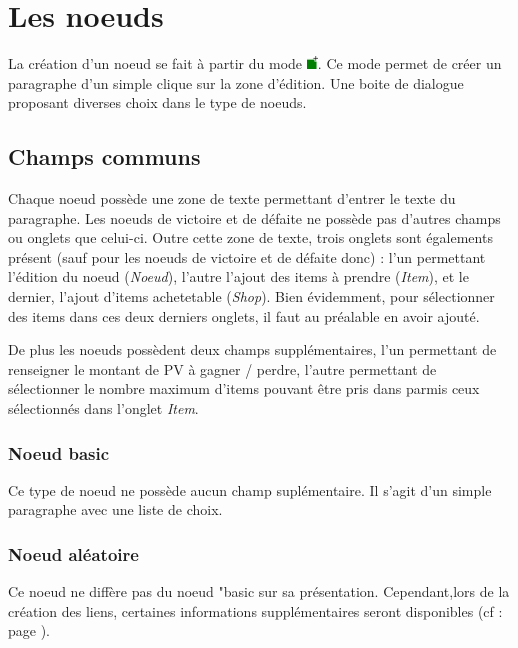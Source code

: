 	\section{Les noeuds}

		\label{sec:noeuds}
		La création d'un noeud se fait à partir du mode \includegraphics[height=10pt, keepaspectratio]{img/icons/add_node.png}. Ce mode permet de créer un paragraphe d'un simple clique sur la zone d'édition. Une boite de dialogue proposant diverses choix dans le type de noeuds.

		\subsection{Champs communs}

			Chaque noeud possède une zone de texte permettant d'entrer le texte du paragraphe. Les noeuds de victoire et de défaite ne possède pas d'autres champs ou onglets que celui-ci. Outre cette zone de texte, trois onglets sont égalements présent (sauf pour les noeuds de victoire et de défaite donc) : l'un permettant l'édition du noeud (\textit{Noeud}), l'autre l'ajout des items à prendre (\textit{Item}), et le dernier, l'ajout d'items achetetable (\textit{Shop}). Bien évidemment, pour sélectionner des items dans ces deux derniers onglets, il faut au préalable en avoir ajouté.

			De plus les noeuds possèdent deux champs supplémentaires, l'un permettant de renseigner le montant de PV à gagner / perdre, l'autre permettant de sélectionner le nombre maximum d'items pouvant être pris dans parmis ceux sélectionnés dans l'onglet \textit{Item}.

			\subsubsection{Noeud basic}

				Ce type de noeud ne possède aucun champ suplémentaire. Il s'agit d'un simple paragraphe avec une liste de choix.

			\subsubsection{Noeud aléatoire}

				Ce noeud ne diffère pas du noeud "basic sur sa présentation. Cependant,lors de la création des liens, certaines informations supplémentaires seront disponibles (cf :  page \pageref{subsubsec:lienAléatoire}).

